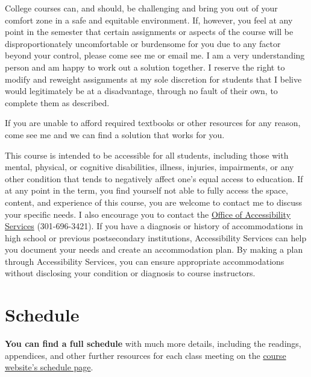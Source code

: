 \documentclass{article}
\begin{document}
College courses can, and should, be challenging and bring you out of
your comfort zone in a safe and equitable environment. If, however, you
feel at any point in the semester that certain assignments or aspects of
the course will be disproportionately uncomfortable or burdensome for
you due to any factor beyond your control, please come see me or email
me. I am a very understanding person and am happy to work out a solution
together. I reserve the right to modify and reweight assignments at my
sole discretion for students that I belive would legitimately be at a
disadvantage, through no fault of their own, to complete them as
described.

If you are unable to afford required textbooks or other resources for
any reason, come see me and we can find a solution that works for you.

This course is intended to be accessible for all students, including
those with mental, physical, or cognitive disabilities, illness,
injuries, impairments, or any other condition that tends to negatively
affect one's equal access to education. If at any point in the term, you
find yourself not able to fully access the space, content, and
experience of this course, you are welcome to contact me to discuss your
specific needs. I also encourage you to contact the
\href{https://www.hood.edu/academics/josephine-steiner-center-academic-achievement-retention/accessibility-services}{Office
of Accessibility Services} (301-696-3421). If you have a diagnosis or
history of accommodations in high school or previous postsecondary
institutions, Accessibility Services can help you document your needs
and create an accommodation plan. By making a plan through Accessibility
Services, you can ensure appropriate accommodations without disclosing
your condition or diagnosis to course instructors.

\hypertarget{schedule}{%
\section*{Schedule}\label{schedule}}

\textbf{You can find a full schedule} with much more details, including
the readings, appendices, and other further resources for each class
meeting on the
\href{http://lawS21.classes.ryansafner.com/schedule/}{course website's
schedule page}.
\end{document}
